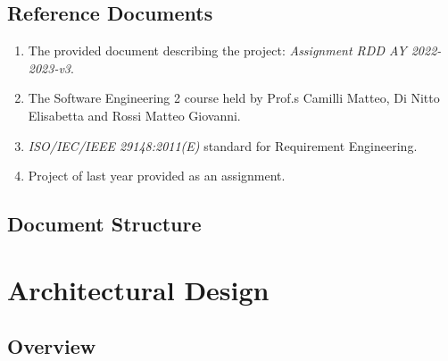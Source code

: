 \documentclass[11pt]{article}
\begin{document}
\subsection{Reference Documents}

\begin{enumerate}
    \item The provided document describing the project: \textit{Assignment RDD AY 2022-2023-v3}.
    \item The Software Engineering 2 course held by Prof.s Camilli Matteo, Di Nitto Elisabetta and Rossi Matteo Giovanni.
    \item \textit{ISO/IEC/IEEE 29148:2011(E)} standard for Requirement Engineering.
    \item Project of last year provided as an assignment.
\end{enumerate}

\subsection{Document Structure}

\newpage

\section{Architectural Design}







\subsection{Overview}
\end{document}

